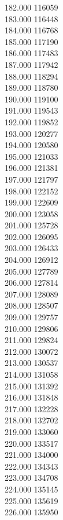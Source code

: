 { 182.000	116059 \\
 183.000	116448 \\
 184.000	116768 \\
 185.000	117190 \\
 186.000	117483 \\
 187.000	117942 \\
 188.000	118294 \\
 189.000	118780 \\
 190.000	119100 \\
 191.000	119543 \\
 192.000	119852 \\
 193.000	120277 \\
 194.000	120580 \\
 195.000	121033 \\
 196.000	121381 \\
 197.000	121797 \\
 198.000	122152 \\
 199.000	122609 \\
 200.000	123058 \\
 201.000	125728 \\
 202.000	126095 \\
 203.000	126433 \\
 204.000	126912 \\
 205.000	127789 \\
 206.000	127814 \\
 207.000	128089 \\
 208.000	128507 \\
 209.000	129757 \\
 210.000	129806 \\
 211.000	129824 \\
 212.000	130072 \\
 213.000	130537 \\
 214.000	131058 \\
 215.000	131392 \\
 216.000	131848 \\
 217.000	132228 \\
 218.000	132702 \\
 219.000	133060 \\
 220.000	133517 \\
 221.000	134000 \\
 222.000	134343 \\
 223.000	134708 \\
 224.000	135145 \\
 225.000	135619 \\
 226.000	135950 \\
}
